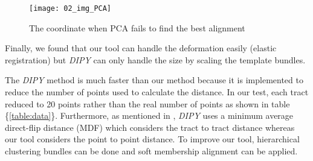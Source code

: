 \documentclass[../structure.tex]{subfiles}
\begin{document}
	\begin{figure}[h!]
	\centering
	\texttt{[image: 02\_img\_PCA]}
	\captionsetup{justification=centering}
	\caption{The coordinate when PCA fails to find the best alignment}
	\label{fig:all_brain}
	\end{figure}
\pagebreak

Finally, we found that our tool can handle the deformation easily (elastic registration) but \textit{DIPY} can only handle the size by scaling the template bundles.

The \textit{DIPY} method is much faster than our method because it is implemented to reduce the number of points used to calculate the distance. In our test, each tract reduced to 20 points rather than the real number of points as shown in table \{\ref{table:data}\}. Furthermore, as mentioned in \cite{Garyfallidis2012}, \textit{DIPY} uses a minimum average direct-flip distance (MDF) which considers the tract to tract distance whereas our tool considers the point to point distance. To improve our tool, hierarchical clustering bundles can be done and soft membership alignment can be applied.
\end{document}
